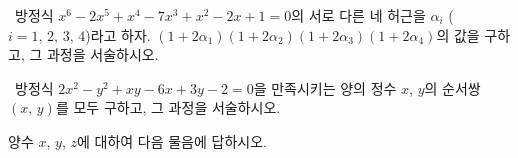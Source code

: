 \documentclass[]{gshs_exam_Q}
\begin{document}

\begin{multicols*}{2}
\begin{questions}\extrawidth{8.1em}\setcounter{question}{3} %

\question[6] \ssh\ 방정식 $x^6 -2x^5 +x^4 -7x^3 +x^2 -2x+1=0$의 서로 다른 네 허근을 $\alpha_i$ ($i=1,\,2,\,3,\,4$)라고 하자. $(1+2\alpha_1 )(1+2\alpha_2 )(1+2\alpha_3 )(1+2\alpha_4 )$의 값을 구하고, 그 과정을 서술하시오.\droppoints

\vspace{34em}

\question[6] \ssh\ 방정식 $2x^2 -y^2 +xy-6x+3y-2=0$을 만족시키는 양의 정수 $x$, $y$의 순서쌍 $(x,\,y)$를 모두 구하고, 그 과정을 서술하시오.\droppoints

\vspace*{\fill}
\columnbreak

\addpoints
\question 양수 $x$, $y$, $z$에 대하여 다음 물음에 답하시오.\droptotalpoints
{}

\end{questions}
\end{multicols*}
\end{document}
